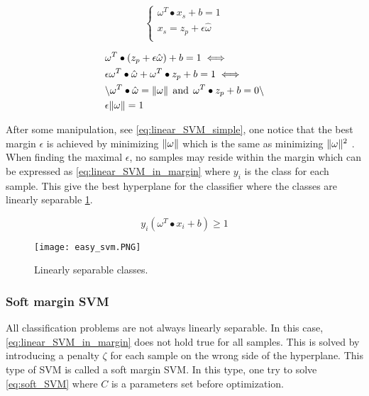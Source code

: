 \begin{equation} \label{eq:linear_SVM}
\begin{cases}
\omega^T \bullet x_s + b =1\\
x_s = z_p + \epsilon \hat{\omega} \\
\end{cases}
\end{equation}

\begin{equation} \label{eq:linear_SVM_simple}
\begin{split}
& \omega^T \bullet (z_p + \epsilon \hat{\omega}) + b = 1  \iff \\
& \epsilon \omega^T \bullet \hat{\omega} + \omega^T \bullet z_p + b = 1 \iff \\
& \backslash \omega^T \bullet \hat{\omega} = \lVert\omega\rVert \:\:  \text{and} \:\: \omega^T \bullet z_p + b = 0  \backslash \\
& \epsilon \lVert\omega\rVert = 1
\end{split}
\end{equation} 

After some manipulation, see \cref{eq:linear_SVM_simple}, one notice that the best margin $\epsilon$ is achieved by minimizing $\lVert\omega\rVert$ which is the same as minimizing $\lVert\omega\rVert^2$ . When finding the maximal $\epsilon$, no samples may reside within the margin which can be expressed as \cref{eq:linear_SVM_in_margin} where $y_i$ is the class for each sample. This give the best hyperplane for the classifier where the classes are linearly separable \cref{fig:easy_class}.

\begin{equation} \label{eq:linear_SVM_in_margin}
y_i(\omega^T \bullet x_i + b) \geq 1
\end{equation} 

\FloatBarrier
\begin{figure}[!h]
	\centering
	\texttt{[image: easy\_svm.PNG]}
	\caption{Linearly separable classes.
		\label{fig:easy_class}}
\end{figure} 
\FloatBarrier


\subsubsection{Soft margin SVM}

All classification problems are not always linearly separable. In this case, \cref{eq:linear_SVM_in_margin} does not hold true for all samples. This is solved by introducing a penalty $\zeta$ \cite{cortes1995support} for each sample on the wrong side of the hyperplane. This type of SVM is called a soft margin SVM. In this type, one try to solve \cref{eq:soft_SVM} where $C$ is a parameters set before optimization. 


